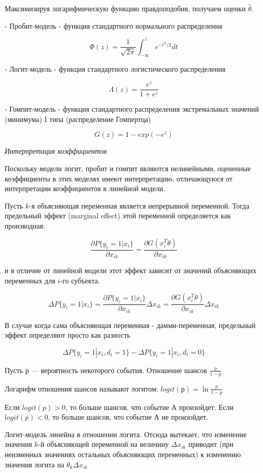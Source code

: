 \documentclass[a4paper,8pt]{article} %
\begin{document}
Максимизируя логарифмическую функцию правдоподобия, получаем оценки $\hat{\theta}$. 


- Пробит-модель - функция стандартного нормального распределения

$$\Phi (z) = \frac{1}{\sqrt{2\pi}} \int_{-\infty}^{z} e^{-t^2/2}dt  $$

- Логит-модель - функция стандартного логистического распределения

$$\Lambda (z) = \frac{e^z}{1+e^z}$$

- Гомпит-модель - функция стандартного распределения экстремальных значений (минимума) I типа (распределение Гомпертца)

$$ G(z) = 1 -exp(-e^z)$$





\textit{Интерпретация коэффициентов}

Поскольку модели логит, пробит и гомпит являются нелинейными, оцененные коэффициенты в этих моделях имеют интерпретацию, отличающуюся
от интерпретации коэффициентов в линейной модели.


Пусть $k$-я объясняющая переменная является непрерывной переменной.
Тогда предельный эффект (marginal effect) этой переменной определяется
как производная:

$$\frac{\partial P\{ y_i = 1| x_i\}}{\partial x_{ik}} = \frac{\partial G (x_i^T \theta )}{\partial x_{ik}}$$

и в отличие от линейной модели этот эффект зависит от значений объясняющих переменных для $i$-го субъекта. 


$$\Delta P\{ y_i = 1| x_i\}  = \frac{\partial P\{ y_i = 1| x_i\}}{\partial x_{ik}} \Delta x_{ik} = \frac{\partial G (x_i^T \theta )}{\partial x_{ik}} \Delta x_{ik}$$

В случае когда сама объясняющая переменная - дамми-переменная, предельный эффект определяют просто как разность

$$\Delta P\{ y_i = 1| x_i, d_i=1\} - \Delta P\{ y_i = 1| x_i, d_i=0\} $$



Пусть $р$ — вероятность некоторого события. Отношение шансов $\frac{p}{1-p}$


Логарифм отношения шансов называют логитом: $logit(р) = \ln  \frac{p}{1-p}$ 


Если  $logit(p) > 0$, то больше шансов, что событие А произойдет. Если $logit(p) < 0$, то больше шансов, что событие А не произойдет.


Логит-модель линейна в отношении логита. Отсюда вытекает, что изменение значения $k$-й объясняющей переменной на величину $\Delta x_{ik}$ приводит (при неизменных значениях остальных объясняющих переменных) к изменению значения логита на $\theta_k \Delta x_{ik} $
\end{document}
